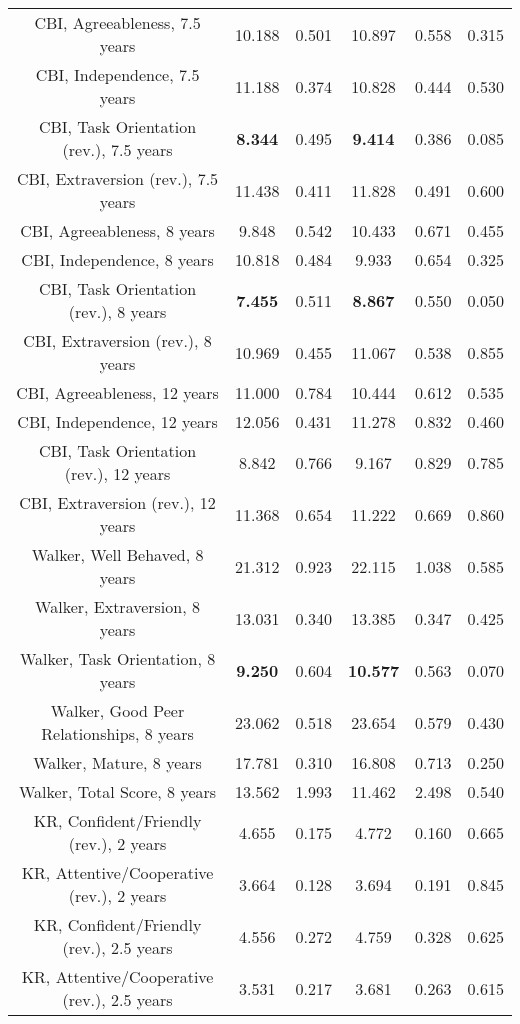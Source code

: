 \begin{longtable}{c c c c c c}
CBI, Agreeableness, 7.5 years & 10.188 & 0.501 &  10.897 & 0.558 & 0.315 \\
CBI, Independence, 7.5 years & 11.188 & 0.374 &  10.828 & 0.444 & 0.530 \\
CBI, Task Orientation (rev.), 7.5 years & \textbf{8.344} & 0.495 &  \textbf{9.414} & 0.386 & 0.085 \\
CBI, Extraversion (rev.), 7.5 years & 11.438 & 0.411 &  11.828 & 0.491 & 0.600 \\
CBI, Agreeableness, 8 years & 9.848 & 0.542 &  10.433 & 0.671 & 0.455 \\
CBI, Independence, 8 years & 10.818 & 0.484 &  9.933 & 0.654 & 0.325 \\
CBI, Task Orientation (rev.), 8 years & \textbf{7.455} & 0.511 &  \textbf{8.867} & 0.550 & 0.050 \\
CBI, Extraversion (rev.), 8 years & 10.969 & 0.455 &  11.067 & 0.538 & 0.855 \\
CBI, Agreeableness, 12 years & 11.000 & 0.784 &  10.444 & 0.612 & 0.535 \\
CBI, Independence, 12 years & 12.056 & 0.431 &  11.278 & 0.832 & 0.460 \\
CBI, Task Orientation (rev.), 12 years & 8.842 & 0.766 &  9.167 & 0.829 & 0.785 \\
CBI, Extraversion (rev.), 12 years & 11.368 & 0.654 &  11.222 & 0.669 & 0.860 \\
Walker, Well Behaved, 8 years & 21.312 & 0.923 &  22.115 & 1.038 & 0.585 \\
Walker, Extraversion, 8 years & 13.031 & 0.340 &  13.385 & 0.347 & 0.425 \\
Walker, Task Orientation, 8 years & \textbf{9.250} & 0.604 &  \textbf{10.577} & 0.563 & 0.070 \\
Walker, Good Peer Relationships, 8 years & 23.062 & 0.518 &  23.654 & 0.579 & 0.430 \\
Walker, Mature, 8 years & 17.781 & 0.310 &  16.808 & 0.713 & 0.250 \\
Walker, Total Score, 8 years & 13.562 & 1.993 &  11.462 & 2.498 & 0.540 \\
KR, Confident/Friendly (rev.), 2 years & 4.655 & 0.175 &  4.772 & 0.160 & 0.665 \\
KR, Attentive/Cooperative (rev.), 2 years & 3.664 & 0.128 &  3.694 & 0.191 & 0.845 \\
KR, Confident/Friendly (rev.), 2.5 years & 4.556 & 0.272 &  4.759 & 0.328 & 0.625 \\
KR, Attentive/Cooperative (rev.), 2.5 years & 3.531 & 0.217 &  3.681 & 0.263 & 0.615 \\

\end{longtable}
